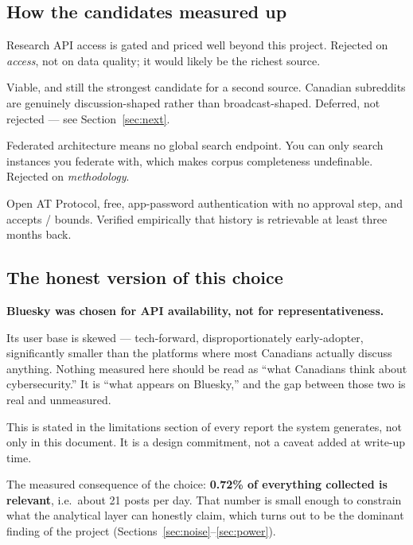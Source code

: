 \documentclass[11pt]{article}
\begin{document}
\subsection{How the candidates measured up}

\begin{description}[leftmargin=1.4em,style=nextline,itemsep=0.35em]
\item[X / Twitter] Research API access is gated and priced well beyond this
  project. Rejected on \emph{access}, not on data quality; it would likely be
  the richest source.
\item[Reddit] Viable, and still the strongest candidate for a second source.
  Canadian subreddits are genuinely discussion-shaped rather than
  broadcast-shaped. Deferred, not rejected --- see Section~\ref{sec:next}.
\item[Mastodon] Federated architecture means no global search endpoint. You can
  only search instances you federate with, which makes corpus completeness
  undefinable. Rejected on \emph{methodology}.
\item[Bluesky] Open AT Protocol, free, app-password authentication with no
  approval step, and  accepts
  / bounds. Verified empirically that history is
  retrievable at least three months back.
\end{description}

\subsection{The honest version of this choice}

\begin{warnbox}
\textbf{Bluesky was chosen for API availability, not for representativeness.}
\end{warnbox}

Its user base is skewed --- tech-forward, disproportionately early-adopter,
significantly smaller than the platforms where most Canadians actually discuss
anything. Nothing measured here should be read as ``what Canadians think about
cybersecurity.'' It is ``what appears on Bluesky,'' and the gap between those
two is real and unmeasured.

This is stated in the limitations section of every report the system generates,
not only in this document. It is a design commitment, not a caveat added at
write-up time.

The measured consequence of the choice: \textbf{0.72\% of everything collected
is relevant}, i.e.\ about 21 posts per day. That number is small enough to
constrain what the analytical layer can honestly claim, which turns out to be
the dominant finding of the project (Sections~\ref{sec:noise}--\ref{sec:power}).
\end{document}
